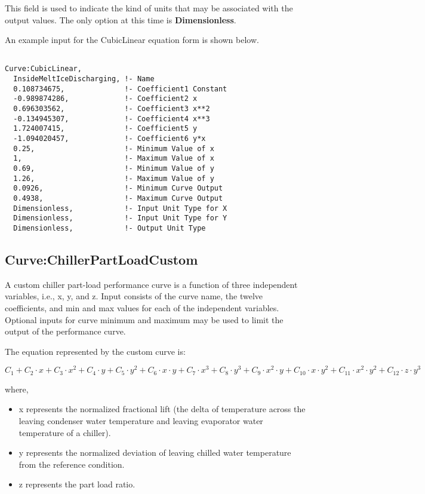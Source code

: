 This field is used to indicate the kind of units that may be associated with the output values. The only option at this time is \textbf{Dimensionless}.

An example input for the CubicLinear equation form is shown below.

\begin{lstlisting}

Curve:CubicLinear, 
  InsideMeltIceDischarging, !- Name
  0.108734675,              !- Coefficient1 Constant
  -0.989874286,             !- Coefficient2 x
  0.696303562,              !- Coefficient3 x**2
  -0.134945307,             !- Coefficient4 x**3
  1.724007415,              !- Coefficient5 y
  -1.094020457,             !- Coefficient6 y*x
  0.25,                     !- Minimum Value of x
  1,                        !- Maximum Value of x
  0.69,                     !- Minimum Value of y
  1.26,                     !- Maximum Value of y
  0.0926,                   !- Minimum Curve Output
  0.4938,                   !- Maximum Curve Output
  Dimensionless,            !- Input Unit Type for X
  Dimensionless,            !- Input Unit Type for Y
  Dimensionless,            !- Output Unit Type
\end{lstlisting}

\subsection{Curve:ChillerPartLoadCustom}\label{curvechillerpartloadcustom}

A custom chiller part-load performance curve is a function of three independent variables, i.e., x, y, and z. Input consists of the curve name, the twelve coefficients, and min and max values for each of the independent variables. Optional inputs for curve minimum and maximum may be used to limit the output of the performance curve.

The equation represented by the custom curve is:

\begin{equation}
C_1 + C_2 \cdot x + C_3 \cdot x^2 + C_4 \cdot y + C_5 \cdot y^2 + C_6 \cdot x \cdot y + C_7 \cdot x^3 + C_8 \cdot y^3 + C_9 \cdot x^2 \cdot y + C_{10} \cdot x \cdot y^2 + C_{11} \cdot x^2 \cdot y^2 + C_{12} \cdot z \cdot y^3
\end{equation}

where,

\begin{itemize}
\tightlist
\item
  x represents the normalized fractional lift (the delta of temperature across the leaving condenser water temperature and leaving evaporator water temperature of a chiller).
\item
  y represents the normalized deviation of leaving chilled water temperature from the reference condition.
\item
  z represents the part load ratio.
\end{itemize}

